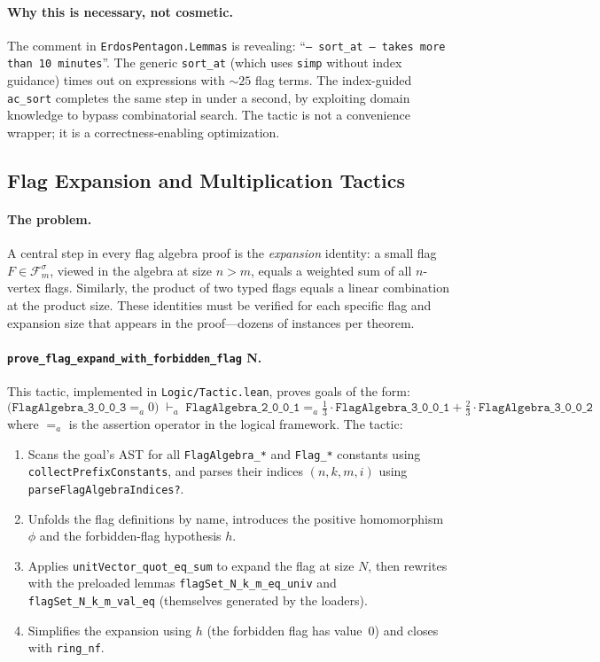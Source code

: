 \documentclass{article}
\newcommand{\Flag}[1]{\mathcal{F}^{#1}}
\newcommand{\lean}[1]{\texttt{#1}}
\begin{document}
\paragraph{Why this is necessary, not cosmetic.}
The comment in \lean{ErdosPentagon.Lemmas} is revealing:
``\texttt{-- sort\_at -- takes more than 10 minutes}''.
The generic \lean{sort\_at} (which uses \lean{simp} without index guidance)
times out on expressions with $\sim 25$ flag terms.  The index-guided
\lean{ac\_sort} completes the same step in under a second, by exploiting domain
knowledge to bypass combinatorial search.  The tactic is not a convenience
wrapper; it is a correctness-enabling optimization.

\subsection{Flag Expansion and Multiplication Tactics}

\paragraph{The problem.}
A central step in every flag algebra proof is the \emph{expansion} identity: a
small flag $F \in \Flag{\sigma}_m$, viewed in the algebra at size $n > m$,
equals a weighted sum of all $n$-vertex flags.  Similarly, the product of two
typed flags equals a linear combination at the product size.  These identities
must be verified for each specific flag and expansion size that appears in the
proof---dozens of instances per theorem.

\paragraph{\lean{prove\_flag\_expand\_with\_forbidden\_flag} N.}
This tactic, implemented in \lean{Logic/Tactic.lean}, proves goals
of the form:
\[
  \bigl(\lean{FlagAlgebra\_3\_0\_0\_3} =_{a} 0\bigr)
  \;\vdash_a\;
  \lean{FlagAlgebra\_2\_0\_0\_1} =_{a} \tfrac{1}{3} \cdot \lean{FlagAlgebra\_3\_0\_0\_1}
    + \tfrac{2}{3} \cdot \lean{FlagAlgebra\_3\_0\_0\_2}
\]
where $=_{a}$ is the assertion operator in the logical framework.  The tactic:
\begin{enumerate}
  \item Scans the goal's AST for all \lean{FlagAlgebra\_*} and \lean{Flag\_*}
    constants using \lean{collectPrefixConstants}, and parses their indices
    $(n, k, m, i)$ using \lean{parseFlagAlgebraIndices?}.
  \item Unfolds the flag definitions by name, introduces the positive
    homomorphism $\phi$ and the forbidden-flag hypothesis $h$.
  \item Applies \lean{unitVector\_quot\_eq\_sum} to expand the flag at size
    $N$, then rewrites with the preloaded lemmas \lean{flagSet\_N\_k\_m\_eq\_univ}
    and \lean{flagSet\_N\_k\_m\_val\_eq} (themselves generated by the loaders).
  \item Simplifies the expansion using $h$ (the forbidden flag has value~0)
    and closes with \lean{ring\_nf}.
\end{enumerate}
\end{document}
